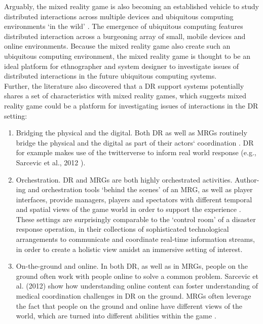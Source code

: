 Arguably, the mixed reality game is also becoming an established vehicle to study distributed interactions across multiple devices and ubiquitous computing environments `in the wild' \cite{Crabtree2006, Benford2005, Fischer2012}. The emergence of ubiquitous computing features distributed interaction across a burgeoning array of small, mobile devices and online environments. Because the mixed reality game also create such an ubiquitous computing environment,  the mixed reality game is thought to be an ideal platform for ethnographer and system designer to investigate issues of distributed interactions in the future ubiquitous computing systems.\\

Further, the literature \cite{Fischer2012} also discovered that a DR support systems potentially shares a set of characteristics with mixed reality games, which suggests mixed reality game could be a platform for investigating issues of interactions in the DR setting:\\

\begin{enumerate}
\item Bridging the physical and the digital. Both DR as well as MRGs routinely bridge the physical and the digital as part of their actors` coordination \cite{Benford2005}. DR for example makes use of the twitterverse to inform real world response (e.g., Sarcevic et al., 2012 \cite{Sarcevic2012}).

\item Orchestration. DR and MRGs are both highly orchestrated activities. Author-ing and orchestration tools `behind the scenes' of an MRG, as well as player interfaces, provide managers, players and spectators with different temporal and spatial views of the game world in order to support the experience \cite{Crabtree2004}. These settings are surprisingly comparable to the `control room' of a disaster response operation, in their collections of sophisticated technological arrangements to communicate and coordinate real-time information streams, in order to create a holistic view amidst an immersive setting of interest.\\

\item On-the-ground and online. In both DR, as well as in MRGs, people on the ground often work with people online to solve a common problem. Sarcevic et al. (2012)\cite{Sarcevic2012} show how understanding online content can foster understanding of medical coordination challenges in DR on the ground. MRGs often leverage the fact that people on the ground and online have different views of the world, which are turned into different abilities within the game \cite{Flintham2003}.\\ 

\end{enumerate}

